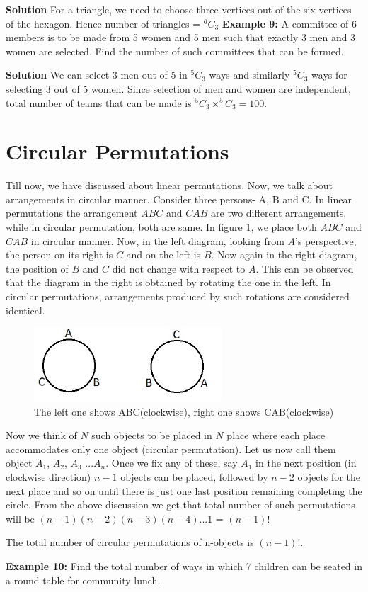 \documentclass[12pt, a4paper]{article}
\begin{document}
\textbf{Solution} For a triangle, we need to choose three vertices out of the six vertices of the hexagon. Hence number of triangles = $^6C_3$ \newline
\textbf{Example 9:} A committee of 6 members is to be made from 5 women and 5 men such that exactly 3 men and 3 women are selected. Find the number of such committees that can be formed.

\textbf{Solution} We can select 3 men out of 5 in $^5C_3$ ways and similarly $^5C_3$ ways for selecting 3 out of 5 women. Since selection of men and women are independent, total number of teams that can be made is $^{5}C_{3} \times ^{5}C_{3} = 100$.
\section{Circular Permutations}
Till now, we have discussed about linear permutations. Now, we talk about arrangements in circular manner. Consider three persons- A, B and C. In linear permutations the arrangement $ABC$ and $CAB$ are two different arrangements, while in circular permutation, both are same. In figure 1, we place both $ABC$ and $CAB$ in circular manner. Now, in the left diagram, looking from $A$'s perspective, the person on its right is $C$ and on the left is $B$. Now again in the right diagram, the position of $B$ and $C$ did not change with respect to $A$. This can be observed that the diagram in the right is obtained by rotating the one in the left. In circular permutations, arrangements produced by such rotations are considered identical.
\begin{figure}
    \centering
    \includegraphics[width=7cm]{PnCcircularpermu.jpg}
    \caption{The left one shows ABC(clockwise), right one shows CAB(clockwise)}
    \label{fig:my_label}
\end{figure} 
Now we think of $N$ such objects to be placed in $N$ place where each place accommodates only one object (circular permutation). Let us now call them object $A_{1}$, $A_{2}$, $A_3$ ...$A_n$. Once we fix any of these, say $A_1$ in the next position (in clockwise direction) $n-1$ objects can be placed, followed by $n-2$ objects for the next place and so on until there is just one last position remaining completing the circle. From the above discussion we get that total number of such permutations will be $(n-1)(n-2)(n-3)(n-4)$...$1$ = $(n-1)!$ 
\begin{tcolorbox}[colback=TealBlue!10!White,colframe=TealBlue!50!black]
The total number of circular permutations of n-objects is $(n-1)!$.
\end{tcolorbox}
\textbf{Example 10:} Find the total number of ways in which 7 children can be seated in a round table for community lunch.
\end{document}
